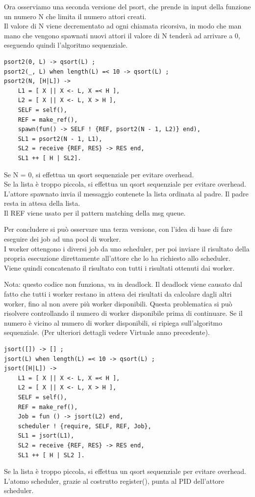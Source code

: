 \documentclass{article}
\begin{document}
Ora osserviamo una seconda versione del psort, che prende in input della funzione un numero N che limita il numero attori creati.\\
Il valore di N viene decrementato ad ogni chiamata ricorsiva, in modo che man mano che vengono spawnati nuovi attori il valore di N tenderà ad arrivare a 0, eseguendo quindi l'algoritmo sequenziale.
\begin{tcolorbox}
\begin{verbatim}
psort2(0, L) -> qsort(L) ;                                      
psort2(_, L) when length(L) =< 10 -> qsort(L) ;                 
psort2(N, [H|L]) ->
    L1 = [ X || X <- L, X =< H ],
    L2 = [ X || X <- L, X > H ],
    SELF = self(),
    REF = make_ref(),
    spawn(fun() -> SELF ! {REF, psort2(N - 1, L2)} end),        
    SL1 = psort2(N - 1, L1),
    SL2 = receive {REF, RES} -> RES end,                        
    SL1 ++ [ H | SL2].
\end{verbatim}
\end{tcolorbox}

Se N = 0, si effettua un qsort sequenziale per evitare overhead.\\
Se la lista è troppo piccola, si effettua un qsort sequenziale per evitare overhead.\\
L'attore spawnato invia il messaggio contenete la lista ordinata al padre. Il padre resta in attesa della lista.\\
Il REF viene usato per il pattern matching della msg queue.

Per concludere si può osservare una terza versione, con l'idea di base di fare eseguire dei job ad una pool di worker.\\
I worker ottengono i diversi job da uno scheduler, per poi inviare il risultato della propria esecuzione direttamente all'attore che lo ha richiesto allo scheduler.\\
Viene quindi concatenato il risultato con tutti i risultati ottenuti dai worker.

Nota: questo codice non funziona, va in deadlock. Il deadlock viene causato dal fatto che tutti i worker restano in attesa dei risultati da calcolare dagli altri worker, fino al non avere più worker disponibili. Questa problematica si può risolvere controllando il numero di worker disponibile prima di continuare. Se il numero è vicino al numero di worker disponibili, si ripiega sull'algoritmo sequenziale. (Per ulteriori dettagli vedere Virtuale anno precedente).
\begin{tcolorbox}
\begin{verbatim}
jsort([]) -> [] ;
jsort(L) when length(L) =< 10 -> qsort(L) ;                     
jsort([H|L]) ->
    L1 = [ X || X <- L, X =< H ],
    L2 = [ X || X <- L, X > H ],
    SELF = self(),
    REF = make_ref(),
    Job = fun () -> jsort(L2) end,
    scheduler ! {require, SELF, REF, Job},                      
    SL1 = jsort(L1),
    SL2 = receive {REF, RES} -> RES end,
    SL1 ++ [ H | SL2 ].
\end{verbatim}
\end{tcolorbox}
Se la lista è troppo piccola, si effettua un qsort sequenziale per evitare overhead.\\
L'atomo scheduler, grazie al costrutto register(), punta al PID dell'attore scheduler.
\end{document}
